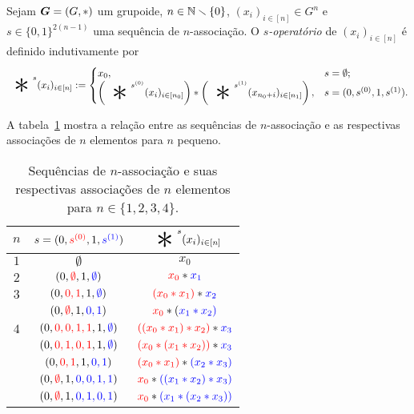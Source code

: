 \begin{definition}
Sejam $\bm G=(G,\ast)$ um grupoide, $n \in \mathbb{N} \smallsetminus \{0\}$, $(x_i)_{i \in [n]} \in G^n$ e $s \in \{0,1\}^{2(n-1)}$ uma sequência de $n$-associação. O \emph{$s$-operatório} de $(x_i)_{i \in [n]}$ é definido indutivamente por
	\begin{equation*}
	\bigopb\nolimits^{s} (x_i)_{i \in [n]} :=
		\begin{cases}
		x_0, & s = \emptyset; \\
		\left( \displaystyle\bigopb\nolimits^{s^{(0)}} (x_i)_{i \in [n_0]} \right) \opb \left( \displaystyle\bigopb\nolimits^{s^{(1)}} (x_{n_0+i})_{i \in [n_1]} \right), & s = (0,s^{(0)},1,s^{(1)}).
		\end{cases}
	\end{equation*}
\end{definition}

A tabela~\ref{tab:associacoesesequencias} mostra a relação entre as sequências de $n$-associação e as respectivas associações de $n$ elementos para $n$ pequeno.

\begin{table}
	\centering

	\begin{tabular}{c c c @{}}
		\toprule
		$n$	& $s=(0,{\color{vermelho} s^{(0)}},1,{\color{azul} s^{(1)}})$	& $\displaystyle\bigopb\nolimits^{s} (x_i)_{i \in [n]}$	\\
		\midrule
		$1$	& $\emptyset$						& $x_0$		\\
		$2$	& $(0,{\color{vermelho} \emptyset},1,{\color{azul} \emptyset})$	& ${\color{vermelho} x_0} \opb {\color{azul} x_1}$	\\
		$3$	& $(0,{\color{vermelho} 0,1},1,{\color{azul} \emptyset})$		& ${\color{vermelho} (x_0 \opb x_1)} \opb {\color{azul} x_2}$	\\
			& $(0,{\color{vermelho} \emptyset},1,{\color{azul} 0,1})$		& ${\color{vermelho} x_0} \opb {(\color{azul} x_1 \opb x_2)}$	\\
		$4$	& $(0,{\color{vermelho} 0,0,1,1},1,{\color{azul} \emptyset})$	& ${\color{vermelho} ((x_0 \opb x_1) \opb x_2)} \opb {\color{azul} x_3}$	\\
			& $(0,{\color{vermelho} 0,1,0,1},1,{\color{azul} \emptyset})$	& ${\color{vermelho} (x_0 \opb (x_1 \opb x_2))} \opb {\color{azul} x_3}$	\\
			& $(0,{\color{vermelho} 0,1},1,{\color{azul} 0,1})$				& ${\color{vermelho} (x_0 \opb x_1)} \opb {\color{azul} (x_2 \opb x_3)} $	\\
			& $(0,{\color{vermelho} \emptyset},1,{\color{azul} 0,0,1,1})$	& ${\color{vermelho} x_0} \opb {\color{azul} ((x_1 \opb x_2) \opb x_3)}$	\\
			& $(0,{\color{vermelho} \emptyset},1,{\color{azul} 0,1,0,1})$	& ${\color{vermelho} x_0} \opb {\color{azul} (x_1 \opb (x_2 \opb x_3))}$	\\
		\bottomrule
	\end{tabular}

	\caption[Sequências de associação]{Sequências de $n$-associação e suas respectivas associações de $n$ elementos para $n \in \{1,2,3,4\}$.}
	\label{tab:associacoesesequencias}
\end{table}

